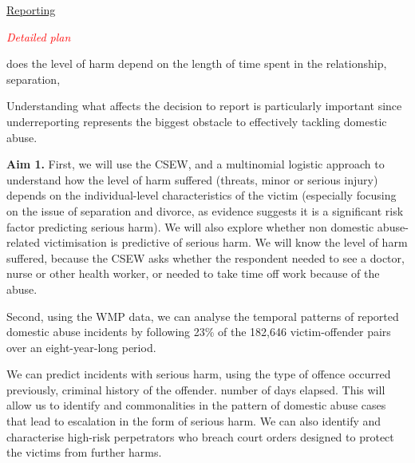 \documentclass[11pt, a4paper]{article}
\begin{document}
\href{http://www.safelives.org.uk/policy-evidence/about-domestic-abuse/how-long-do-people-live-domestic-abuse-and-when-do-they-get}{Reporting} 


\textcolor{red}{\textit{Detailed plan}}

does the level of harm depend on the length of time spent in the relationship, separation, 

Understanding what affects the decision to report is particularly important since underreporting represents the biggest obstacle to effectively tackling domestic abuse.

\textbf{Aim 1.} First, we will use the CSEW, and a multinomial logistic approach to understand how the level of harm suffered (threats, minor or serious injury) depends on the individual-level characteristics of the victim (especially focusing on the issue of separation and divorce, as evidence suggests it is a significant risk factor predicting serious harm). We will also explore whether non domestic abuse-related victimisation is predictive of serious harm. We will know the level of harm suffered, because the CSEW asks whether the respondent needed to see a doctor, nurse or other health worker, or needed to take time off work because of the abuse. 

Second, using the WMP data, we can analyse the temporal patterns of reported domestic abuse incidents by following  23\% of the 182,646 victim-offender pairs over an eight-year-long period. 

We can predict incidents with serious harm, using the type of offence occurred previously, criminal history of the offender. number of days elapsed. This will allow us to identify and commonalities in the pattern of domestic abuse cases that lead to escalation in the form of serious harm. We can also identify and characterise high-risk perpetrators who breach court orders designed to protect the victims from further harms.

\end{document}

